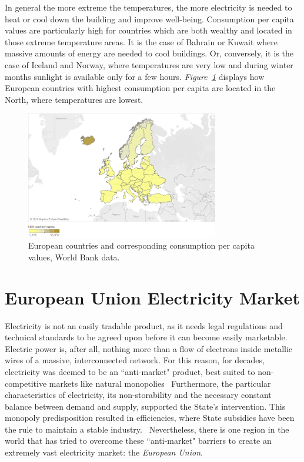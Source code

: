 \documentclass[a4paper,12pt]{book}
\begin{document}
In general the more extreme the temperatures, the more electricity is needed to heat or cool down the building and improve well-being. Consumption per capita values are particularly high for countries which are both wealthy and located in those extreme temperature areas. It is the case of Bahrain or Kuwait where massive amounts of energy are needed to cool buildings. Or, conversely, it is the case of Iceland and Norway, where temperatures are very low and during winter months sunlight is available only for a few hours. \textit{Figure~\ref{fig:conspc}} displays how European countries with highest consumption per capita are located in the North, where temperatures are lowest.

\begin{figure}[hbt]
\begin{center}
\captionsetup{justification=centering}
\includegraphics[width=0.75\textwidth]{Images/cons.png}
\caption{European countries and corresponding consumption per capita values, World Bank data. }
\label{fig:conspc}
\end{center}
\end{figure}

\section{European Union Electricity Market}

Electricity is not an easily tradable product, as it needs legal regulations and technical standards to be agreed upon before it can become easily marketable. Electric power is, after all, nothing more than a flow of electrons inside metallic wires of a massive, interconnected network. For this reason, for decades, electricity was deemed to be an ``anti-market" product, best suited to non-competitive markets like natural monopolies~\cite{glachant2014eu} Furthermore, the particular characteristics of electricity, its non-storability and the necessary constant balance between demand and supply, supported the State's intervention. This monopoly predisposition resulted in efficiencies, where State subsidies have been the rule to maintain a stable industry.~\cite{domanico2007concentration} Nevertheless, there is one region in the world that has tried to overcome these ``anti-market" barriers to create an extremely vast electricity market: the \textit{European Union}.
\end{document}
